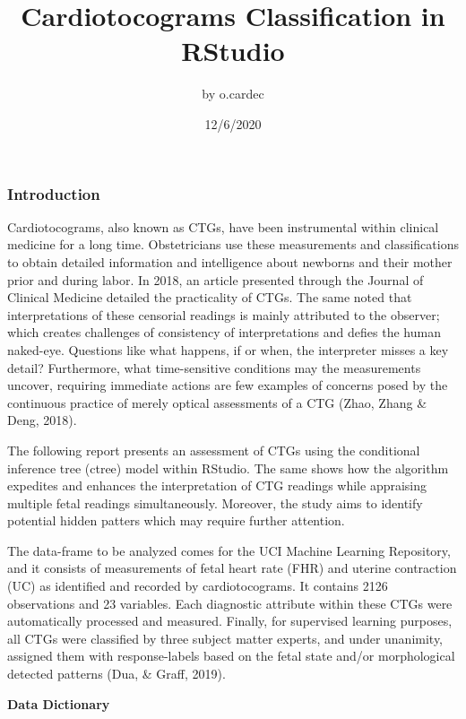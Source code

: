 \documentclass[
]{article}
\title{Cardiotocograms Classification in RStudio}
\author{by o.cardec}
\date{12/6/2020}
\begin{document}
\maketitle

\hypertarget{introduction}{%
\subsubsection{Introduction}\label{introduction}}

Cardiotocograms, also known as CTGs, have been instrumental within
clinical medicine for a long time. Obstetricians use these measurements
and classifications to obtain detailed information and intelligence
about newborns and their mother prior and during labor. In 2018, an
article presented through the Journal of Clinical Medicine detailed the
practicality of CTGs. The same noted that interpretations of these
censorial readings is mainly attributed to the observer; which creates
challenges of consistency of interpretations and defies the human
naked-eye. Questions like what happens, if or when, the interpreter
misses a key detail? Furthermore, what time-sensitive conditions may the
measurements uncover, requiring immediate actions are few examples of
concerns posed by the continuous practice of merely optical assessments
of a CTG (Zhao, Zhang \& Deng, 2018).

The following report presents an assessment of CTGs using the
conditional inference tree (ctree) model within RStudio. The same shows
how the algorithm expedites and enhances the interpretation of CTG
readings while appraising multiple fetal readings simultaneously.
Moreover, the study aims to identify potential hidden patters which may
require further attention.

The data-frame to be analyzed comes for the UCI Machine Learning
Repository, and it consists of measurements of fetal heart rate (FHR)
and uterine contraction (UC) as identified and recorded by
cardiotocograms. It contains 2126 observations and 23 variables. Each
diagnostic attribute within these CTGs were automatically processed and
measured. Finally, for supervised learning purposes, all CTGs were
classified by three subject matter experts, and under unanimity,
assigned them with response-labels based on the fetal state and/or
morphological detected patterns (Dua, \& Graff, 2019).

\textbf{Data Dictionary}
\end{document}
